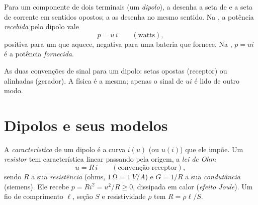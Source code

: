 \begin{notation}\label{not:b1:dc-circuits:conventions}
Para um componente de dois terminais (um \emph{dipolo}), a \emph{} desenha a seta de  e a seta de corrente em sentidos
opostos; a \emph{} as desenha no mesmo
sentido. Na , a potência \emph{recebida} pelo
dipolo vale
\[
p = u\,i \qquad (\text{watts}),
\]
positiva para um  que aquece, negativa para uma bateria que
fornece. Na , $p = ui$ é a potência
\emph{fornecida}.
\end{notation}

\begin{omfigure}

{\small As duas convenções de sinal para um dipolo: setas opostas
(receptor) ou alinhadas (gerador). A física é a mesma; apenas o
sinal de $ui$ é lido de outro modo.}
\end{omfigure}

\section{Dipolos e seus modelos}

\begin{definition}\label{def:b1:dc-circuits:resistor}
A \emph{característica} de um dipolo é a curva $i(u)$ (ou $u(i)$)
que ele impõe. Um \emph{resistor} tem característica linear passando pela
origem, a \emph{lei de Ohm}
\[
u = R\,i \qquad (\text{convenção receptor}),
\]
sendo $R$ a sua \emph{resistência} (ohms, $\qty{1}{\ohm} = \qty{1}{V/A}$) e
$G = 1/R$ a sua \emph{condutância} (siemens). Ele recebe $p = Ri^2 =
u^2/R \geq 0$, dissipada em calor (\emph{efeito Joule}). Um fio de
comprimento $\ell$, seção $S$ e resistividade $\rho$ tem
$R = \rho\ell/S$.
\end{definition}


